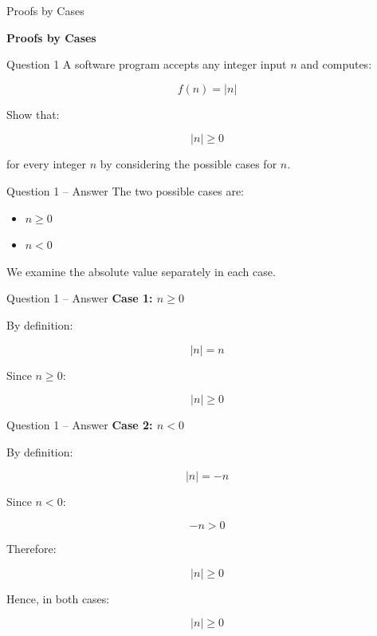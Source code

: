 \begin{frame}{Proofs by Cases}
\begin{center}
\vspace{1.5cm}
{\Huge\textbf{Proofs by Cases}}
\end{center}
\end{frame}


\begin{frame}{Question 1}
A software program accepts any integer input $n$ and computes:

$$
f(n)=|n|
$$

Show that:

$$
|n|\geq 0
$$

for every integer $n$ by considering the possible cases for $n$.
\end{frame}

\begin{frame}{Question 1 -- Answer}
The two possible cases are:

\begin{itemize}
\item $n\geq 0$
\item $n<0$
\end{itemize}

We examine the absolute value separately in each case.
\end{frame}

\begin{frame}{Question 1 -- Answer}
\textbf{Case 1: $n\geq0$}

By definition:

$$
|n|=n
$$

Since $n\geq0$:

$$
|n|\geq0
$$

\end{frame}

\begin{frame}{Question 1 -- Answer}
\textbf{Case 2: $n<0$}

By definition:

$$
|n|=-n
$$

Since $n<0$:

$$
-n>0
$$

Therefore:

$$
|n|\geq0
$$

Hence, in both cases:

$$
\boxed{|n|\geq0}
$$

\end{frame}

